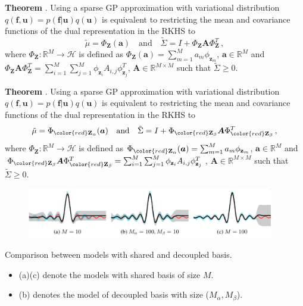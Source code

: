\documentclass[aspectratio=149]{beamer}
\begin{document}
    \begin{frame}
        \textbf{Theorem} \citep{cheng2016incremental}. Using a sparse GP approximation with variational distribution \(q(\mathbf{f}, \mathbf{u}) = p(\mathbf{f}|\mathbf{u})q(\mathbf{u})\) is equivalent to restricting the mean and covariance functions of the dual representation in the RKHS to
        \[
            \tilde{\mu} = \Phi_{\mathbf{Z}}(\bm{a}) \quad \text{and} \quad \tilde{\Sigma} = I + \Phi_{\mathbf{Z}}\bm{A}\Phi_{\mathbf{Z}}^T\,,
        \]
        where \(\Phi_{\mathbf{Z}}: \mathbb{R}^M \to \mathcal{H} \) is defined as \(\Phi_{\mathbf{Z}}(\bm{a}) = \sum_{m=1}^{M} a_m \phi_{\mathbf{z}_m}\),  \(\bm{a} \in \mathbb{R}^M\) and \(\Phi_{\mathbf{Z}}\bm{A}\Phi_{\mathbf{Z}}^T= \sum_{i=1}^{M}\sum_{j=1}^M\phi_{\mathbf{z}_i} A_{i,j} \phi_{\mathbf{z}_j}^T\), \(\bm{A} \in \mathbb{R}^{M\times M}\) such that \(\tilde{\Sigma} \geq 0\).
    \end{frame}

    \begin{frame}
        \textbf{Theorem} \citep{cheng2016incremental}. Using a sparse GP approximation with variational distribution \(q(\mathbf{f}, \mathbf{u}) = p(\mathbf{f}|\mathbf{u})q(\mathbf{u})\) is equivalent to restricting the mean and covariance functions of the dual representation in the RKHS to
        \[
            \tilde{\mu} = \Phi_{\color{red}\mathbf{Z}_\alpha}(\bm{a}) \quad \text{and} \quad \tilde{\Sigma} = I + \Phi_{\color{red}\mathbf{Z}_\beta }\bm{A}\Phi_{\color{red}\mathbf{Z}_\beta}^T\,,
        \]
        where \(\Phi_{\mathbf{Z}}: \mathbb{R}^M \to \mathcal{H} \) is defined as \(\Phi_{\color{red}\mathbf{Z}_\alpha }(\bm{a}) = \sum_{m=1}^{M} a_m \phi_{\mathbf{z}_m}\),  \(\bm{a} \in \mathbb{R}^M\) and \(\Phi_{\color{red}\mathbf{Z}_\beta }\bm{A}\Phi_{\color{red}\mathbf{Z}_\beta }^T= \sum_{i=1}^{M}\sum_{j=1}^M\phi_{\mathbf{z}_i} A_{i,j} \phi_{\mathbf{z}_j}^T\), \(\bm{A} \in \mathbb{R}^{M\times M}\) such that \(\tilde{\Sigma} \geq 0\).
    \end{frame}

     {\begin{frame}

        \begin{figure}
            \centering
            \includegraphics[width = 0.96\textwidth]{slides_imgs/decoupled.jpg}
        \end{figure}
        Comparison between models with shared and decoupled basis.
        
        \begin{itemize}
            \item (a)(c) denote the models with shared basis of size \(M\).
            \item (b) denotes the model of decoupled basis with size (\(M_\alpha, M_\beta\)).
        \end{itemize} 
    \end{frame}}
\end{document}
